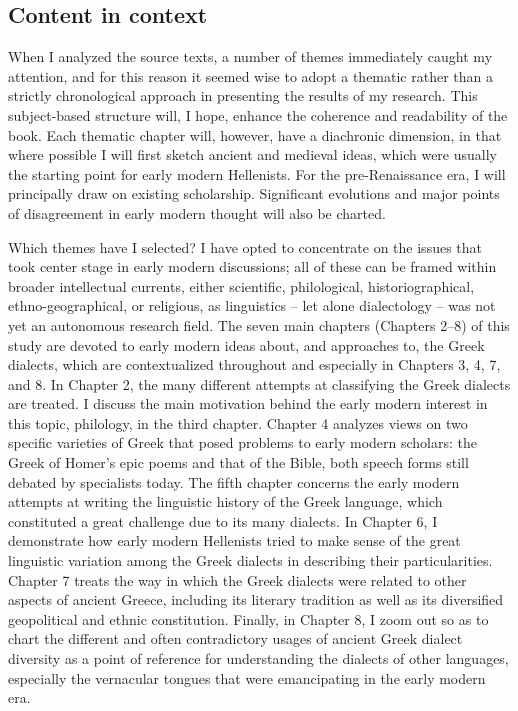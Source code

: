 \subsection{Content in context}
\hypertarget{Toc19704805}{}
When I analyzed the source texts, a number of themes immediately caught my attention, and for this reason it seemed wise to adopt a thematic rather than a strictly chronological approach in presenting the results of my research. This subject-based structure will, I hope, enhance the coherence and readability of the book. Each thematic chapter will, however, have a diachronic dimension, in that where possible I will first sketch ancient and medieval ideas, which were usually the starting point for early modern Hellenists. For the pre-Renaissance era, I will principally draw on existing scholarship. Significant evolutions and major points of disagreement in early modern thought will also be charted.

Which themes have I selected? I have opted to concentrate on the issues that took center stage in early modern discussions; all of these can be framed within broader intellectual currents, either scientific, philological, historiographical, ethno-geographical, or religious, as linguistics – let alone dialectology – was not yet an autonomous research field. The seven main chapters (Chapters 2–8) of this study are devoted to early modern ideas about, and approaches to, the Greek dialects, which are contextualized throughout and especially in Chapters 3, 4, 7, and 8. In Chapter 2, the many different attempts at classifying the Greek dialects are treated. I discuss the main motivation behind the early modern interest in this topic, philology, in the third chapter. Chapter 4 analyzes views on two specific varieties of Greek that posed problems to early modern scholars: the Greek of Homer’s epic poems and that of the Bible, both speech forms still debated by specialists today. The fifth chapter concerns the early modern attempts at writing the linguistic history of the Greek language, which constituted a great challenge due to its many dialects. In Chapter 6, I demonstrate how early modern Hellenists tried to make sense of the great linguistic variation among the Greek dialects in describing their particularities. Chapter 7 treats the way in which the Greek dialects were related to other aspects of ancient Greece, including its literary tradition as well as its diversified geopolitical and ethnic constitution. Finally, in Chapter 8, I zoom out so as to chart the different and often contradictory usages of ancient Greek dialect diversity as a point of reference for understanding the dialects of other languages, especially the vernacular tongues that were emancipating in the early modern era.

